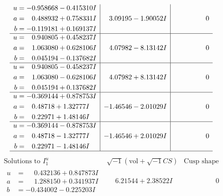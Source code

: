 \documentclass[1p]{elsarticle_modified}
\theoremstyle{definition}
\newcommand{\I}{\sqrt{-1}}
\begin{document}
$$\begin{array}{c|c|c}
\begin{aligned}
u &= -0.958668 - 0.415310 I \\
a &= \phantom{-}0.488932 + 0.758331 I \\
b &= -0.119181 + 0.169137 I\end{aligned}
 & \phantom{-}3.09195 - 1.90052 I & \phantom{-0.000000 } 0 \\ \hline\begin{aligned}
u &= \phantom{-}0.940805 + 0.458237 I \\
a &= \phantom{-}1.063080 + 0.628106 I \\
b &= \phantom{-}0.045194 - 0.137682 I\end{aligned}
 & \phantom{-}4.07982 - 8.13142 I & \phantom{-0.000000 } 0 \\ \hline\begin{aligned}
u &= \phantom{-}0.940805 - 0.458237 I \\
a &= \phantom{-}1.063080 - 0.628106 I \\
b &= \phantom{-}0.045194 + 0.137682 I\end{aligned}
 & \phantom{-}4.07982 + 8.13142 I & \phantom{-0.000000 } 0 \\ \hline\begin{aligned}
u &= -0.369144 + 0.878753 I \\
a &= \phantom{-}0.48718 + 1.32777 I \\
b &= \phantom{-}0.22971 + 1.48146 I\end{aligned}
 & -1.46546 - 2.01029 I & \phantom{-0.000000 } 0 \\ \hline\begin{aligned}
u &= -0.369144 - 0.878753 I \\
a &= \phantom{-}0.48718 - 1.32777 I \\
b &= \phantom{-}0.22971 - 1.48146 I\end{aligned}
 & -1.46546 + 2.01029 I & \phantom{-0.000000 } 0\\
 \hline 
 \end{array}$$\newpage$$\begin{array}{c|c|c}  
\text{Solutions to }I^u_{1}& \I (\text{vol} + \sqrt{-1}CS) & \text{Cusp shape}\\
 \hline 
\begin{aligned}
u &= \phantom{-}0.432136 + 0.847873 I \\
a &= \phantom{-}1.288150 + 0.341937 I \\
b &= -0.434002 - 0.225203 I\end{aligned}
 & \phantom{-}6.21544 + 2.38522 I & \phantom{-0.000000 } 0 \\ \hline\begin{aligned}

\end{aligned}
\end{array}$$
\end{document}
